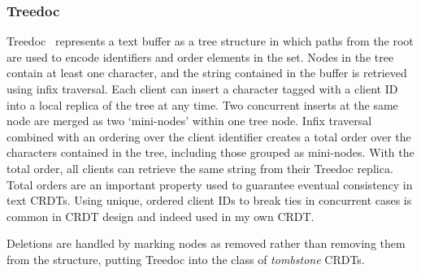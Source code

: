 \documentclass[12pt,a4paper,twoside,openright]{report}
\begin{document}
		\subsubsection{Treedoc}
		
		Treedoc~\cite{preguica2009} represents a text buffer as a tree structure in which paths from the root are used to encode identifiers and order elements in the set. Nodes in the tree contain at least one character, and the string contained in the buffer is retrieved using infix traversal. Each client can insert a character tagged with a client ID into a local replica of the tree at any time. Two concurrent inserts at the same node are merged as two `mini-nodes' within one tree node. Infix traversal combined with an ordering over the client identifier creates a total order over the characters contained in the tree, including those grouped as mini-nodes. With the total order, all clients can retrieve the same string from their Treedoc replica. Total orders are an important property used to guarantee eventual consistency in text CRDTs. Using unique, ordered client IDs to break ties in concurrent cases is common in CRDT design and indeed used in my own CRDT.
		
		Deletions are handled by marking nodes as removed rather than removing them from the structure, putting Treedoc into the class of \textit{tombstone} CRDTs.
		
\end{document}
